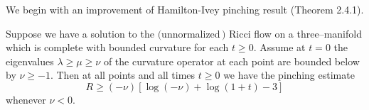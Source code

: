 We begin with an improvement of Hamilton-Ivey pinching result
 (Theorem 2.4.1).

\begin{theorem}
  \label{thm:cz-hamilton-ivey-pinching-estimate}

Suppose we have a solution to the $($unnormalized$\,)$\; Ricci\;
flow\; on\; a\; three--manifold\; which\; is\; complete\; with
bounded curvature for each $t\geq0$. Assume at $t=0$ the
eigenvalues $\lambda\geq\mu\geq\nu$ of the curvature operator at
each point are bounded below by $\nu\geq-1$. Then at all points
and all times $t\geq0$ we have the pinching estimate
$$
R\geq(-\nu)[\log(-\nu)+\log(1+t)-3]
$$
whenever $\nu<0$.
\end{theorem}

